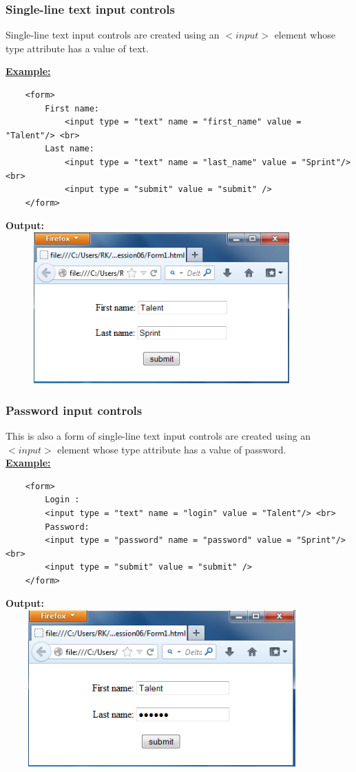 \documentclass[11pt,a4paper]{article}
\begin{document}
\subsubsection*{Single-line text input controls}
Single-line text input controls are created using an $<input>$ element whose type attribute has a value of text.\

\underline{\textbf{Example:}}
\begin{verbatim}
    <form>
        First name: 
            <input type = "text" name = "first_name" value = "Talent"/> <br>
        Last name: 
            <input type = "text" name = "last_name" value = "Sprint"/> <br>
            <input type = "submit" value = "submit" />
    </form>
\end{verbatim}
\textbf{Output:}\\
\includegraphics[height = 58mm, width = 120mm]{Form1.png}

\subsubsection*{Password input controls}
This is also a form of single-line text input controls are created using an $<input>$ element whose type attribute has a value of password.\\

\underline{\textbf{Example:}}
\begin{verbatim}
    <form>
        Login : 
        <input type = "text" name = "login" value = "Talent"/> <br>
        Password: 
        <input type = "password" name = "password" value = "Sprint"/> <br>
        <input type = "submit" value = "submit" />
    </form>
\end{verbatim}
\textbf{Output:}\\
\includegraphics[height = 60mm, width = 120mm]{Form2.png}
\end{document}
